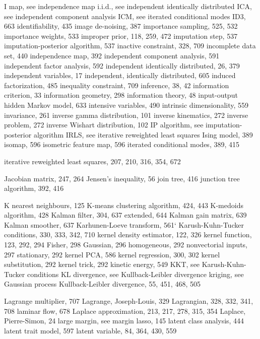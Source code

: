 \documentclass[
  10
]{article}
\begin{document}
I map, see independence map i.i.d., see independent identically
distributed ICA, see independent component analysis ICM, see iterated
conditional modes ID3, 663 identifiability, 435 image de-noising, 387
importance sampling, 525, 532 importance weights, 533 improper prior,
118, 259, 472 imputation step, 537 imputation-posterior algorithm, 537
inactive constraint, 328, 709 incomplete data set, 440 independence map,
392 independent component analysis, 591 independent factor analysis, 592
independent identically distributed, 26, 379 independent variables, 17
independent, identically distributed, 605 induced factorization, 485
inequality constraint, 709 inference, 38, 42 information criterion, 33
information geometry, 298 information theory, 48 input-output hidden
Markov model, 633 intensive variables, 490 intrinsic dimensionality, 559
invariance, 261 inverse gamma distribution, 101 inverse kinematics, 272
inverse problem, 272 inverse Wishart distribution, 102 IP algorithm, see
imputation-posterior algorithm IRLS, see iterative reweighted least
squares Ising model, 389 isomap, 596 isometric feature map, 596 iterated
conditional modes, 389, 415

iterative reweighted least squares, 207, 210, 316, 354, 672

Jacobian matrix, 247, 264 Jensen's inequality, 56 join tree, 416
junction tree algorithm, 392, 416

K nearest neighbours, 125 K-means clustering algorithm, 424, 443
K-medoids algorithm, 428 Kalman filter, 304, 637 extended, 644 Kalman
gain matrix, 639 Kalman smoother, 637 Karhunen-Loeve transform, 561`
Karush-Kuhn-Tucker conditions, 330, 333, 342, 710 kernel density
estimator, 122, 326 kernel function, 123, 292, 294 Fisher, 298 Gaussian,
296 homogeneous, 292 nonvectorial inputs, 297 stationary, 292 kernel
PCA, 586 kernel regression, 300, 302 kernel substitution, 292 kernel
trick, 292 kinetic energy, 549 KKT, see Karush-Kuhn-Tucker conditions KL
divergence, see Kullback-Leibler divergence kriging, see Gaussian
process Kullback-Leibler divergence, 55, 451, 468, 505

Lagrange multiplier, 707 Lagrange, Joseph-Louis, 329 Lagrangian, 328,
332, 341, 708 laminar flow, 678 Laplace approximation, 213, 217, 278,
315, 354 Laplace, Pierre-Simon, 24 large margin, see margin lasso, 145
latent class analysis, 444 latent trait model, 597 latent variable, 84,
364, 430, 559
\end{document}
